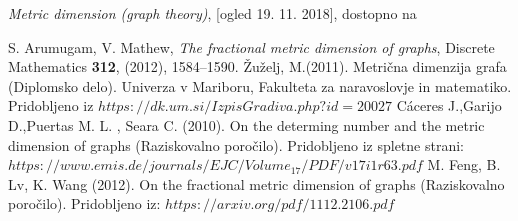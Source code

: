\documentclass[a4paper]{report}
\begin{document}
\begin{thebibliography}{99}

 \textit{Metric dimension (graph theory)}, [ogled 19. 11. 2018], dostopno na %

 S. Arumugam, V. Mathew, \textit{The fractional metric dimension of graphs}, Discrete Mathematics \textbf{312},  (2012), 1584–1590.
 Žuželj, M.(2011). Metrična dimenzija grafa (Diplomsko delo). Univerza v Mariboru, Fakulteta za naravoslovje in matematiko. Pridobljeno iz $https://dk.um.si/IzpisGradiva.php?id=20027$
 Cáceres J.,Garijo D.,Puertas M. L. , Seara C. (2010). On the determing number and the metric dimension of graphs (Raziskovalno poročilo). Pridobljeno iz spletne strani: $https://www.emis.de/journals/EJC/Volume_17/PDF/v17i1r63.pdf$
 M. Feng, B. Lv, K. Wang (2012). On the fractional metric dimension of graphs (Raziskovalno poročilo). Pridobljeno iz: $https://arxiv.org/pdf/1112.2106.pdf$

\end{thebibliography}
\end{document}

